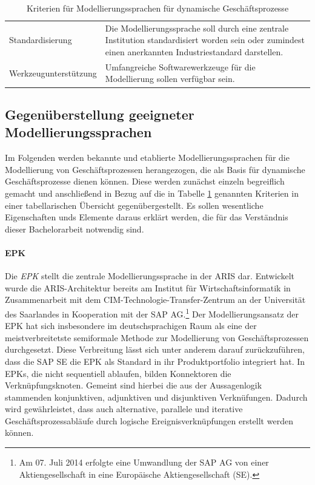 \begin{table}[H]
\begin{tabularx}{\textwidth}{l X}
		Standardisierung &   
		Die Modellierungssprache soll durch eine zentrale Institution standardisiert worden sein oder zumindest einen anerkannten Industriestandard darstellen. \\ \cmidrule(r){1-1} \cmidrule(r){2-2}
		
		Werkzeugunterstützung &   
		Umfangreiche Softwarewerkzeuge für die Modellierung sollen verfügbar sein.  \\
	    \bottomrule
	\end{tabularx}
	\caption[Kriterien für Modellierungssprachen]
    {Kriterien für Modellierungssprachen für dynamische Geschäftsprozesse}
    \label{tab:Kriterien für Modellierungssprachen}
\end{table}

\subsection{Gegenüberstellung geeigneter Modellierungssprachen}
Im Folgenden werden bekannte und etablierte Modellierungssprachen für die Modellierung von Geschäftsprozessen herangezogen, die als Basis für dynamische Geschäftsprozesse dienen können. 
Diese werden zunächst einzeln begreiflich gemacht und anschließend in Bezug auf die in Tabelle \ref{tab:Kriterien für Modellierungssprachen} genannten Kriterien in einer tabellarischen Übersicht gegenübergestellt. 
Es sollen wesentliche Eigenschaften unds Elemente daraus erklärt werden, die für das Verständnis dieser Bachelorarbeit notwendig sind.

\paragraph{\acl{EPK}}
Die \textit{\acf{EPK}} stellt die zentrale Modellierungssprache in der \acf{ARIS} dar.
Entwickelt wurde die \ac{ARIS}-Architektur bereits \citeyear{Scheer.1991} am Institut für Wirtschaftsinformatik in Zusammenarbeit mit dem \ac{CIM}-Technologie-Transfer-Zentrum an der Universität des Saarlandes in Kooperation mit der SAP AG.\footnote{Am 07. Juli 2014 erfolgte eine Umwandlung der SAP AG von einer Aktiengesellschaft in eine Europäische Aktiengesellschaft (SE).}
\cite{Scheer.1991}
Der Modellierungsansatz der \ac{EPK} hat sich insbesondere im deutschsprachigen Raum als eine der meistverbreitetste semiformale Methode zur Modellierung von Geschäftsprozessen durchgesetzt. 
\cite{Gadatsch.2013}
Diese Verbreitung lässt sich unter anderem darauf zurückzuführen, dass die SAP SE die \ac{EPK} als Standard in ihr Produktportfolio integriert hat. 
\cite{Staud.2006}
In \ac{EPK}s, die nicht sequentiell ablaufen, bilden Konnektoren die Verknüpfungsknoten. Gemeint sind hierbei die aus der Aussagenlogik stammenden konjunktiven, adjunktiven und disjunktiven Verknüfungen. Dadurch wird gewährleistet, dass auch alternative, parallele und iterative Geschäftsprozessabläufe durch logische Ereignisverknüpfungen erstellt werden können.
\cite{Lehmann.2008}

